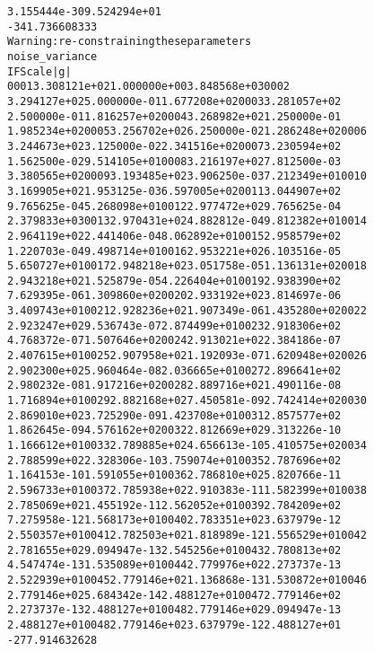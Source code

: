 \documentclass[letterpaper,10pt,english]{/usr/share/sphinx/texinputs/sphinxhowto}
\newenvironment{InvisibleVerbatim}
        {\begin{mdframed}[leftmargin=0.1\linewidth,innerleftmargin=3pt,innerrightmargin=3pt, userdefinedwidth=1\linewidth, linewidth=0pt, linecolor=white, usetwoside=false]}
        {\end{mdframed}}
\begin{document}
\begin{InvisibleVerbatim}
\begin{alltt}
3.155444e-30   9.524294e+01
-341.736608333
Warning: re-constraining these parameters
noise\_variance
 I      F              Scale          |g|
 0001   3.308121e+02   1.000000e+00   3.848568e+03  0002
3.294127e+02   5.000000e-01   1.677208e+02  0003   3.281057e+02
2.500000e-01   1.816257e+02  0004   3.268982e+02   1.250000e-01
1.985234e+02  0005   3.256702e+02   6.250000e-02   1.286248e+02  0006
3.244673e+02   3.125000e-02   2.341516e+02  0007   3.230594e+02
1.562500e-02   9.514105e+01  0008   3.216197e+02   7.812500e-03
3.380565e+02  0009   3.193485e+02   3.906250e-03   7.212349e+01  0010
3.169905e+02   1.953125e-03   6.597005e+02  0011   3.044907e+02
9.765625e-04   5.268098e+01  0012   2.977472e+02   9.765625e-04
2.379833e+03  0013   2.970431e+02   4.882812e-04   9.812382e+01  0014
2.964119e+02   2.441406e-04   8.062892e+01  0015   2.958579e+02
1.220703e-04   9.498714e+01  0016   2.953221e+02   6.103516e-05
5.650727e+01  0017   2.948218e+02   3.051758e-05   1.136131e+02  0018
2.943218e+02   1.525879e-05   4.226404e+01  0019   2.938390e+02
7.629395e-06   1.309860e+02  0020   2.933192e+02   3.814697e-06
3.409743e+01  0021   2.928236e+02   1.907349e-06   1.435280e+02  0022
2.923247e+02   9.536743e-07   2.874499e+01  0023   2.918306e+02
4.768372e-07   1.507646e+02  0024   2.913021e+02   2.384186e-07
2.407615e+01  0025   2.907958e+02   1.192093e-07   1.620948e+02  0026
2.902300e+02   5.960464e-08   2.036665e+01  0027   2.896641e+02
2.980232e-08   1.917216e+02  0028   2.889716e+02   1.490116e-08
1.716894e+01  0029   2.882168e+02   7.450581e-09   2.742414e+02  0030
2.869010e+02   3.725290e-09   1.423708e+01  0031   2.857577e+02
1.862645e-09   4.576162e+02  0032   2.812669e+02   9.313226e-10
1.166612e+01  0033   2.789885e+02   4.656613e-10   5.410575e+02  0034
2.788599e+02   2.328306e-10   3.759074e+01  0035   2.787696e+02
1.164153e-10   1.591055e+01  0036   2.786810e+02   5.820766e-11
2.596733e+01  0037   2.785938e+02   2.910383e-11   1.582399e+01  0038
2.785069e+02   1.455192e-11   2.562052e+01  0039   2.784209e+02
7.275958e-12   1.568173e+01  0040   2.783351e+02   3.637979e-12
2.550357e+01  0041   2.782503e+02   1.818989e-12   1.556529e+01  0042
2.781655e+02   9.094947e-13   2.545256e+01  0043   2.780813e+02
4.547474e-13   1.535089e+01  0044   2.779976e+02   2.273737e-13
2.522939e+01  0045   2.779146e+02   1.136868e-13   1.530872e+01  0046
2.779146e+02   5.684342e-14   2.488127e+01  0047   2.779146e+02
2.273737e-13   2.488127e+01  0048   2.779146e+02   9.094947e-13
2.488127e+01  0048   2.779146e+02   3.637979e-12   2.488127e+01
-277.914632628
\end{alltt}

            \end{InvisibleVerbatim}
            
\end{document}
